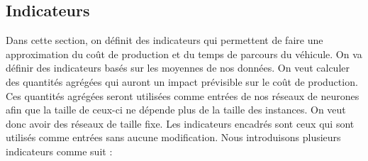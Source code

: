 \subsection{Indicateurs}
Dans cette section, on définit des indicateurs qui permettent de faire une approximation du coût de production et du temps de parcours du véhicule. On va définir des indicateurs basés sur les moyennes de nos données. On veut calculer des quantités agrégées qui auront un impact prévisible sur le coût de production. Ces quantités agrégées seront utilisées comme entrées de nos réseaux de neurones afin que la taille de ceux-ci ne dépende plus de la taille des instances. On veut donc avoir des réseaux de taille fixe. Les indicateurs encadrés sont ceux qui sont utilisés comme entrées sans aucune modification.
Nous introduisons plusieurs indicateurs comme suit :
